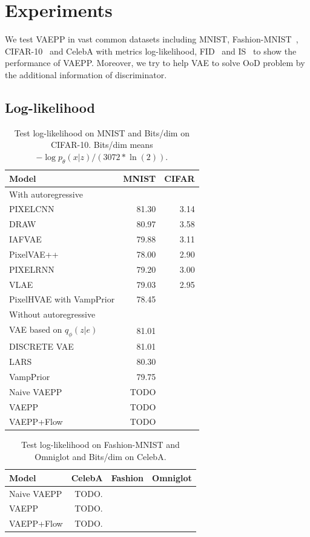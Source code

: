 \section{Experiments}
We test VAEPP in vast common datasets including MNIST, Fashion-MNIST~\cite{xiao2017/online}, CIFAR-10~\cite{krizhevsky2009learning} and CelebA with metrics log-likelihood, FID~\cite{heusel2017gans} and IS~\cite{salimans2016improved} to show the performance of VAEPP. Moreover, we try to help VAE to solve OoD problem by the additional information of discriminator. 
\subsection{Log-likelihood}
\begin{table}[tb]
\centering
\begin{tabular}{lrr}  
\toprule
Model  &  MNIST & CIFAR\\
\midrule
With autoregressive   \\
PIXELCNN         &  81.30  &  3.14   \\
DRAW             &  80.97  &  3.58    \\
IAFVAE           &  79.88  &  3.11    \\
PixelVAE++       &  78.00  &  2.90   \\
PIXELRNN         &  79.20  &  3.00    \\
VLAE             &  79.03  &  2.95     \\
PixelHVAE with VampPrior &  78.45  &     \\
\midrule
Without autoregressive   \\
VAE based on $q_\phi(z|e)$   &  81.01 \\
DISCRETE VAE     &  81.01      \\
LARS             &  80.30     \\
VampPrior        &  79.75      \\
Naive VAEPP      &  TODO      \\
VAEPP            &  TODO      \\
VAEPP+Flow       &  TODO      \\
\bottomrule
\end{tabular}
\caption{Test log-likelihood on MNIST and Bits/dim on CIFAR-10. Bits/dim means $-\log p_\theta(x|z) / (3072 * \ln(2))$.}
\label{tab:mnist-nll}
\end{table}
\begin{table}[tb]
\centering
\begin{tabular}{lrrr}  
\toprule
Model  &  CelebA & Fashion & Omniglot \\
\midrule
Naive VAEPP           &  TODO.     \\
VAEPP                 &  TODO.     \\
VAEPP+Flow            &  TODO.     \\
\bottomrule
\end{tabular}
\caption{Test log-likelihood on Fashion-MNIST and Omniglot and Bits/dim on CelebA. }
\label{tab:cifar-nll}
\end{table}
